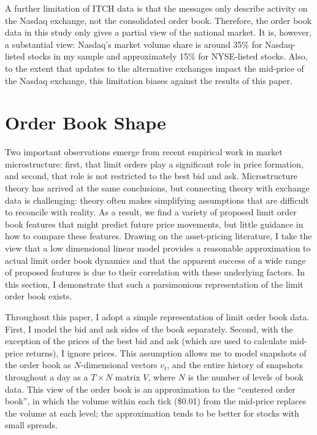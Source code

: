 A further limitation of ITCH data is that the messages only describe activity on the Nasdaq exchange, not the consolidated order book. Therefore, the order book data in this study only gives a partial view of the national market. It is, however, a substantial view: Nasdaq's market volume share is around 35\% for Nasdaq-listed stocks in my sample and approximately 15\% for NYSE-listed stocks. Also, to the extent that updates to the alternative exchanges impact the mid-price of the Nasdaq exchange, this limitation biases against the results of this paper.


\section{Order Book Shape}

Two important observations emerge from recent empirical work in market microstructure: first, that limit orders play a significant role in price formation, and second, that role is not restricted to the best bid and ask. Microstructure theory has arrived at the same conclusions, but connecting theory with exchange data is challenging: theory often makes simplifying assumptions that are difficult to reconcile with reality. As a result, we find a variety of proposed limit order book features that might predict future price movements, but little guidance in how to compare these features. Drawing on the asset-pricing literature, I take the view that a low dimensional linear model provides a reasonable approximation to actual limit order book dynamics and that the apparent success of a wide range of proposed features is due to their correlation with these underlying factors. In this section, I demonstrate that such a parsimonious representation of the limit order book exists.

Throughout this paper, I adopt a simple representation of limit order book data. First, I model the bid and ask sides of the book separately. Second, with the exception of the prices of the best bid and ask (which are used to calculate mid-price returns), I ignore prices. This assumption allows me to model snapshots of the order book as $N$-dimensional vectors $v_t$, and the entire history of snapshots throughout a day as a $T \times N$ matrix $V$, where $N$ is the number of levels of book data. This view of the order book is an approximation to the ``centered order book'', in which the volume within each tick (\$0.01) from the mid-price replaces the volume at each level; the approximation tends to be better for stocks with small spreads.

